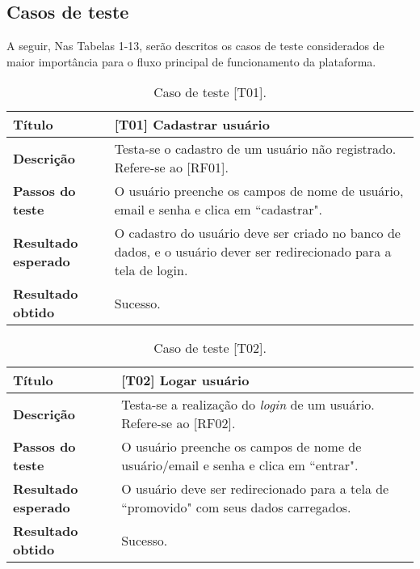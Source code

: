 \subsection{Casos de teste}
A seguir, Nas Tabelas 1-13, serão descritos os casos de teste considerados de maior importância para o fluxo principal de funcionamento da plataforma.

\begin{table}[hbt!]
    \centering
    \begin{tabularx}{0.9\textwidth}{l|X}
    \hline
    \textbf {Título} & [T01] Cadastrar usuário \\\hline
    \textbf {Descrição} & Testa-se o cadastro de um usuário não registrado. Refere-se ao [RF01]. \\ \hline
    \textbf {Passos do teste} & O usuário preenche os campos de nome de usuário, email e senha e clica em “cadastrar". \\ \hline
    \textbf {Resultado esperado} & O cadastro do usuário deve ser criado no banco de dados, e o usuário dever ser redirecionado para a tela de login. \\ \hline
    \textbf {Resultado obtido} & Sucesso. \\ \hline
    \end{tabularx}
    \caption{Caso de teste [T01].}
\end{table}


\begin{table}[hbt!]
    \centering
    \begin{tabularx}{0.9\textwidth}{l|X}
    \hline
    \textbf {Título} & [T02] Logar usuário \\\hline
    \textbf {Descrição} & Testa-se a realização do \textit{login} de um usuário. Refere-se ao [RF02]. \\ \hline
    \textbf {Passos do teste} & O usuário preenche os campos de nome de usuário/email e senha e clica em “entrar". \\ \hline
    \textbf {Resultado esperado} & O usuário deve ser redirecionado para a tela de “promovido" com seus dados carregados. \\ \hline
    \textbf {Resultado obtido} & Sucesso. \\ \hline
    \end{tabularx}
    \caption{Caso de teste [T02].}
\end{table}

